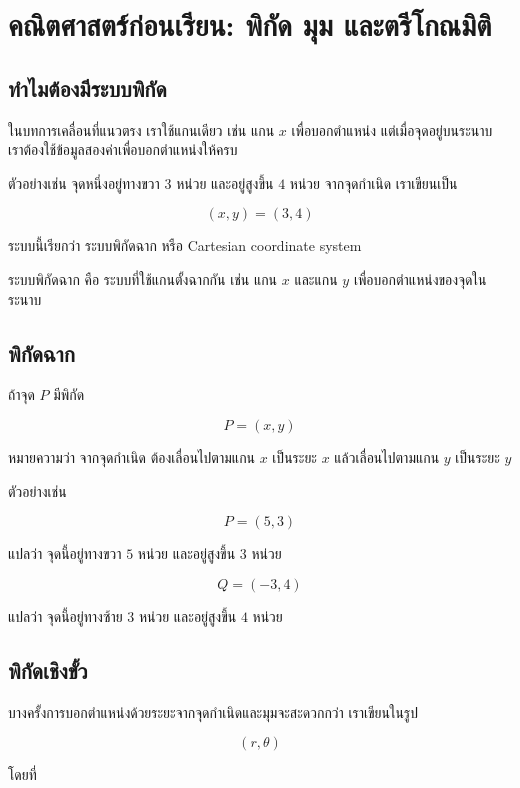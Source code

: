 \newpage{}

\section{คณิตศาสตร์ก่อนเรียน: พิกัด มุม และตรีโกณมิติ}

\subsection{ทำไมต้องมีระบบพิกัด}

ในบทการเคลื่อนที่แนวตรง เราใช้แกนเดียว เช่น แกน $x$ เพื่อบอกตำแหน่ง แต่เมื่อจุดอยู่บนระนาบ เราต้องใช้ข้อมูลสองค่าเพื่อบอกตำแหน่งให้ครบ

ตัวอย่างเช่น จุดหนึ่งอยู่ทางขวา $3$ หน่วย และอยู่สูงขึ้น $4$ หน่วย จากจุดกำเนิด เราเขียนเป็น

\[
(x,y)=(3,4)
\]

ระบบนี้เรียกว่า ระบบพิกัดฉาก หรือ Cartesian coordinate system

\begin{tcolorbox}[title=นิยาม]
ระบบพิกัดฉาก คือ ระบบที่ใช้แกนตั้งฉากกัน เช่น แกน $x$ และแกน $y$ เพื่อบอกตำแหน่งของจุดในระนาบ
\end{tcolorbox}

\subsection{พิกัดฉาก}

ถ้าจุด $P$ มีพิกัด

\[
P=(x,y)
\]

หมายความว่า จากจุดกำเนิด ต้องเลื่อนไปตามแกน $x$ เป็นระยะ $x$ แล้วเลื่อนไปตามแกน $y$ เป็นระยะ $y$

ตัวอย่างเช่น

\[
P=(5,3)
\]

แปลว่า จุดนี้อยู่ทางขวา $5$ หน่วย และอยู่สูงขึ้น $3$ หน่วย

\[
Q=(-3,4)
\]

แปลว่า จุดนี้อยู่ทางซ้าย $3$ หน่วย และอยู่สูงขึ้น $4$ หน่วย

\subsection{พิกัดเชิงขั้ว}

บางครั้งการบอกตำแหน่งด้วยระยะจากจุดกำเนิดและมุมจะสะดวกกว่า เราเขียนในรูป

\[
(r,\theta)
\]

โดยที่

